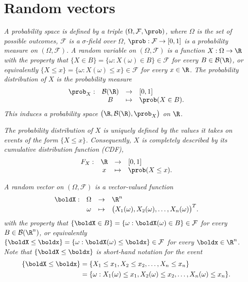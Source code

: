 \section{Random vectors}
\ben
\it A \emph{probability space} is defined by a triple $(\Omega,\mathcal{F},\prob)$, where
\bit
\it $\Omega$ is the set of possible outcomes,
\it $\mathcal{F}$ is a $\sigma$-field over $\Omega$, 
\it $\prob:\mathcal{F}\to[0,1]$ is a probability measure on $(\Omega,\mathcal{F})$.
\eit
\it A \emph{random variable} on $(\Omega,\mathcal{F})$ is a function $X:\Omega\to\R$ with the property that
\bit
\it $\{X\in B\}=\{\omega: X(\omega) \in B\}\in\mathcal{F}$ for every $B\in\mathcal{B}(\R)$, or equivalently
\it $\{X\leq x\}=\{\omega: X(\omega) \leq x\}\in\mathcal{F}$ for every $x\in\R$.
\eit
\it The \emph{probability distribution} of $X$ is the probability measure
\[\begin{array}{rccl}
\prob_X:	& \mathcal{B}(\R) 	& \to 		& [0,1] \\
			& B					& \mapsto	& \prob(X\in B).
\end{array}\]
This induces a probability space $\big(\R,\mathcal{B}(\R),\prob_X\big)$ on $\R$.

\it The probability distribution of $X$ is uniquely defined by the values it takes on events of the form $\{X\leq x\}$. Consequently, $X$ is completely described by its \emph{cumulative distribution function} (CDF),
\[\begin{array}{rccl}
F_X:	& \R 	& \to 		& [0,1] \\
		& x		& \mapsto	& \prob(X\leq x).
\end{array}\]

\it A \emph{random vector} on $(\Omega,\mathcal{F})$ is a vector-valued function 
\[\begin{array}{rccl}
\boldX:	& \Omega 	& \to 		& \R^n \\
		& \omega	& \mapsto	& \big(X_1(\omega),X_2(\omega),\ldots,X_n(\omega)\big)^T.
\end{array}\]
with the property that
\bit
\it $\{\boldX\in B\}=\{\omega: \boldX(\omega) \in B\}\in\mathcal{F}$ for every $B\in\mathcal{B}(\R^n)$, or equivalently
\it $\{\boldX\leq \boldx\}=\{\omega: \boldX(\omega) \leq \boldx\}\in\mathcal{F}$ for every $\boldx\in\R^n$.
\eit
Note that $\{\boldX\leq \boldx\}$ is short-hand notation for the event
\begin{align*}
\{\boldX\leq \boldx\} 
	& = \{X_1\leq x_1, X_2\leq x_2, \ldots, X_n\leq x_n\} \\
	& = \{\omega: X_1(\omega)\leq x_1, X_2(\omega)\leq x_2, \ldots, X_n(\omega)\leq x_n\}.
\end{align*}

